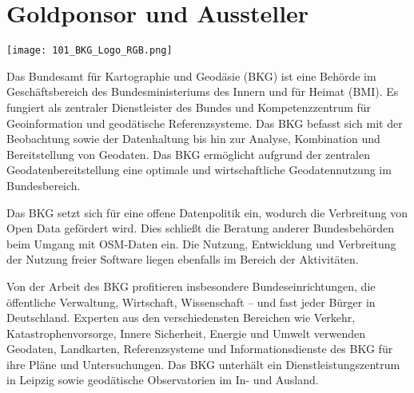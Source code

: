 \section*{Goldponsor und Aussteller}

\centerline{\texttt{[image: 101\_BKG\_Logo\_RGB.png]}}

Das Bundesamt für Kartographie und Geodäsie (BKG) ist eine Behörde im Geschäftsbereich des Bundesministeriums des Innern und für Heimat (BMI). Es fungiert als zentraler Dienstleister des Bundes und Kompetenzzentrum für Geoinformation und geodätische Referenzsysteme. Das BKG befasst sich mit der Beobachtung sowie der Datenhaltung bis hin zur Analyse, Kombination und Bereitstellung von Geodaten. Das BKG ermöglicht aufgrund der zentralen Geodatenbereitstellung eine optimale und wirtschaftliche Geodatennutzung im Bundesbereich.

Das BKG setzt sich für eine offene Datenpolitik ein, wodurch die Verbreitung von Open Data gefördert wird. Dies schließt die Beratung anderer Bundesbehörden beim Umgang mit OSM-Daten ein. Die Nutzung, Entwicklung und Verbreitung der Nutzung freier Software liegen ebenfalls im Bereich der Aktivitäten.

Von der Arbeit des BKG profitieren insbesondere Bundeseinrichtungen, die öffentliche Verwaltung, Wirtschaft, Wissenschaft – und fast jeder Bürger in Deutschland. Experten aus den verschiedensten Bereichen wie Verkehr, Katastrophenvorsorge, Innere Sicherheit, Energie und Umwelt verwenden Geodaten, Landkarten, Referenzsysteme und Informationsdienste des BKG für ihre Pläne und Untersuchungen. Das BKG unterhält ein Dienstleistungszentrum in Leipzig sowie geodätische Observatorien im In- und Ausland.
